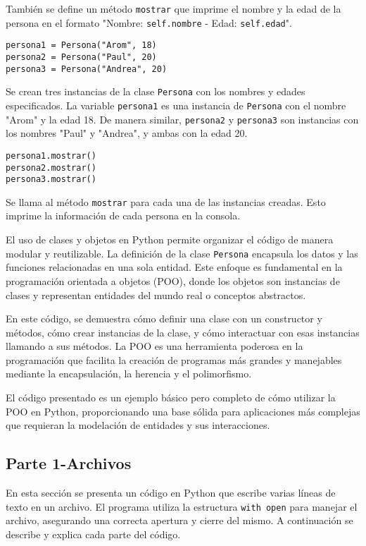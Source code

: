\documentclass[conference]{IEEEtran}
\begin{document}
También se define un método \texttt{mostrar} que imprime el nombre y la edad de la persona en el formato "Nombre: \texttt{self.nombre} - Edad: \texttt{self.edad}".

\begin{verbatim}
persona1 = Persona("Arom", 18)
persona2 = Persona("Paul", 20)
persona3 = Persona("Andrea", 20)
\end{verbatim}

Se crean tres instancias de la clase \texttt{Persona} con los nombres y edades especificados. La variable \texttt{persona1} es una instancia de \texttt{Persona} con el nombre "Arom" y la edad 18. De manera similar, \texttt{persona2} y \texttt{persona3} son instancias con los nombres "Paul" y "Andrea", y ambas con la edad 20.

\begin{verbatim}
persona1.mostrar()
persona2.mostrar()
persona3.mostrar()
\end{verbatim}

Se llama al método \texttt{mostrar} para cada una de las instancias creadas. Esto imprime la información de cada persona en la consola.

El uso de clases y objetos en Python permite organizar el código de manera modular y reutilizable. La definición de la clase \texttt{Persona} encapsula los datos y las funciones relacionadas en una sola entidad. Este enfoque es fundamental en la programación orientada a objetos (POO), donde los objetos son instancias de clases y representan entidades del mundo real o conceptos abstractos.

En este código, se demuestra cómo definir una clase con un constructor y métodos, cómo crear instancias de la clase, y cómo interactuar con esas instancias llamando a sus métodos. La POO es una herramienta poderosa en la programación que facilita la creación de programas más grandes y manejables mediante la encapsulación, la herencia y el polimorfismo.

El código presentado es un ejemplo básico pero completo de cómo utilizar la POO en Python, proporcionando una base sólida para aplicaciones más complejas que requieran la modelación de entidades y sus interacciones.


\subsection{Parte 1-Archivos}

En esta sección se presenta un código en Python que escribe varias líneas de texto en un archivo. El programa utiliza la estructura \texttt{with open} para manejar el archivo, asegurando una correcta apertura y cierre del mismo. A continuación se describe y explica cada parte del código.
\end{document}
